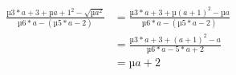 \begin{align}
\frac{µ{3*a+3}+µ{a+1}^2-\sqrt{µ{a^2}}}{µ{6*a}-(µ{5*a}-2)} & =\frac{µ{3*a+3}+µ{(a+1)^2}-µ{a}}{µ{6*a}-(µ{5*a-2})}\\
& =\frac{µ{3*a+3+(a+1)^2-a}}{µ{6*a-5*a+2}}\\
& =µ{a+2}\\
\end{align}